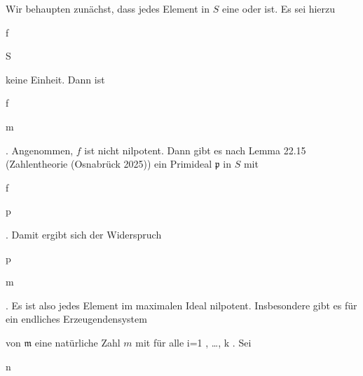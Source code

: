 {


Wir behaupten zunächst, dass jedes Element in $S$ eine
oder
ist. Es sei hierzu


\mavergleichskette

{\vergleichskette

{ f
}

{ \in }{ S
}

{  }{
}

{    }{
}

{   }{
}

}
{}{}{}
keine Einheit. Dann ist


\mavergleichskette

{\vergleichskette

{ f
}

{ \in }{ {\mathfrak m}
}

{  }{
}

{    }{
}

{   }{
}

}
{}{}{.}
Angenommen, $f$ ist nicht nilpotent. Dann gibt es nach
Lemma 22.15 (Zahlentheorie (Osnabrück 2025))
ein Primideal ${\mathfrak p}$ in $S$ mit


\mavergleichskette

{\vergleichskette

{ f
}

{ \notin }{ {\mathfrak p}
}

{  }{
}

{    }{
}

{   }{
}

}
{}{}{.}
Damit ergibt sich der Widerspruch


\mavergleichskette

{\vergleichskette

{ {\mathfrak p} }

{ \neq }{ {\mathfrak m}
}

{  }{
}

{    }{
}

{   }{
}

}
{}{}{.}
Es ist also jedes Element im maximalen Ideal nilpotent. Insbesondere gibt es für ein endliches Erzeugendensystem

 von ${\mathfrak m}$ eine natürliche Zahl $m$ mit   {  für alle  }  { i=1 , \ldots ,  k   }{ .} Sei


\mavergleichskette

{\vergleichskette

{ n
}

}}
